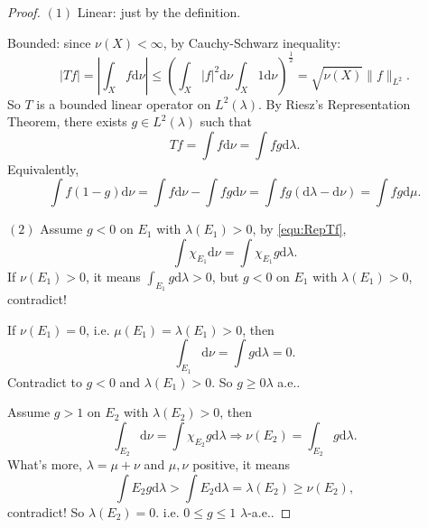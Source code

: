 \documentclass{article}
\newcommand{\norm}[1]{\|#1\|}
\newcommand{\dif}{\mathrm{d}}
\begin{document}
\begin{proof}
    $(1)$ Linear: just by the definition. 

    Bounded: since $\nu(X)<\infty$, by Cauchy-Schwarz inequality:
    \begin{displaymath}
        |Tf|=\left|\int_{X}f\dif\nu\right|
        \le\left(\int_{X}|f|^{2}\dif\nu\int_{X}1\dif\nu\right)
        ^{\frac{1}{2}}
        =\sqrt{\nu(X)}\norm{f}_{L^2}.
    \end{displaymath}
    So $T$ is a bounded linear operator on $L^{2}(\lambda)$. 
    By Riesz's Representation Theorem, there exists 
    $g\in L^{2}(\lambda)$ such that 
    \begin{equation}
        \label{equ:RepTf}
        Tf=\int f\dif\nu=\int fg\dif\lambda.
    \end{equation}
    Equivalently, 
    \begin{equation}
        \label{equ:Repdifmu}
        \int f(1-g)\dif\nu=\int f\dif\nu
        -\int fg\dif\nu
        =\int fg(\dif\lambda-\dif\nu)
        =\int fg\dif\mu.
    \end{equation}

    $(2)$ Assume $g<0$ on $E_1$ with $\lambda(E_1)>0$, 
    by \eqref{equ:RepTf}, 
    \begin{displaymath}
        \int\chi_{E_1}\dif\nu=\int \chi_{E_1}g\dif\lambda.
    \end{displaymath}
    If $\nu(E_1)>0$, it means $\int_{E_1}g\dif\lambda>0$, 
    but $g<0$ on $E_1$ with $\lambda(E_1)>0$, contradict! 

    If $\nu(E_1)=0$, i.e. $\mu(E_1)=\lambda(E_1)>0$, 
    then 
    \begin{displaymath}
        \int_{E_1}\dif\nu=\int g\dif\lambda=0.
    \end{displaymath}
    Contradict to $g<0$ and $\lambda(E_1)>0$. So $g\ge 0 \lambda$ a.e..

    Assume $g>1$ on $E_2$ with $\lambda(E_2)>0$, then 
    \begin{displaymath}
        \int_{E_2}\dif\nu=\int\chi_{E_2}g\dif\lambda
        \Rightarrow \nu(E_2)=\int_{E_2}g\dif\lambda.
    \end{displaymath}
    What's more, $\lambda=\mu+\nu$ and $\mu,\nu$ positive, 
    it means 
    \begin{displaymath}
        \int E_2 g\dif\lambda>\int E_2\dif\lambda=\lambda(E_2)
        \ge\nu(E_2),
    \end{displaymath}
    contradict! So $\lambda(E_2)=0$. i.e. $0\le g\le 1$ $\lambda$-a.e..


\end{proof}
\end{document}
